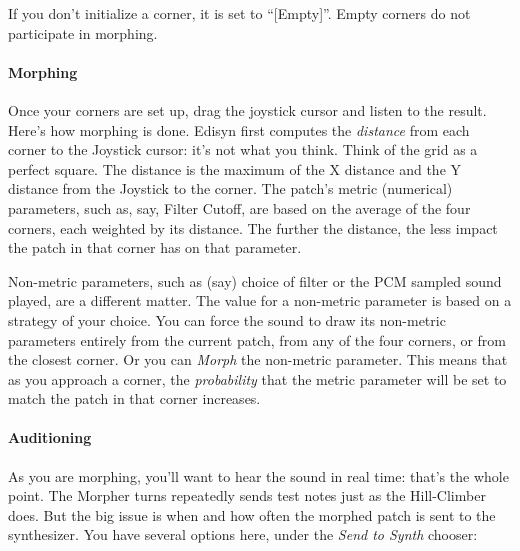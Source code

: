 \documentclass{article}
\begin{document}
If you don't initialize a corner, it is set to ``[Empty]''.  Empty corners do not participate in morphing.

\paragraph{Morphing} Once your corners are set up, drag the joystick cursor and listen to the result.  Here's how morphing is done.  Edisyn first computes the {\it distance} from each corner to the Joystick cursor: it's not what you think.  Think of the grid as a perfect square.  The distance is the maximum of the X distance and the Y distance from the Joystick to the corner.  The patch's metric (numerical) parameters, such as, say, Filter Cutoff, are based on the average of the four corners, each weighted by its distance.  The further the distance, the less impact the patch in that corner has on that parameter.

Non-metric parameters, such as (say) choice of filter or the PCM sampled sound played, are a different matter.  The value for a non-metric parameter is based on a strategy of your choice.  You can force the sound to draw its non-metric parameters entirely from  the current patch, from any of the four corners, or from the closest corner.  Or you can {\it Morph} the non-metric parameter.  This means that as you approach a corner, the {\it probability} that the metric parameter will be set to match the patch in that corner increases.  

\paragraph{Auditioning} As you are morphing, you'll want to hear the sound in real time: that's the whole point.  The Morpher turns repeatedly sends test notes just as the Hill-Climber does.   But the big issue is when and how often the morphed patch is sent to the synthesizer.  You have several options here, under the {\it Send to Synth} chooser:
\end{document}
